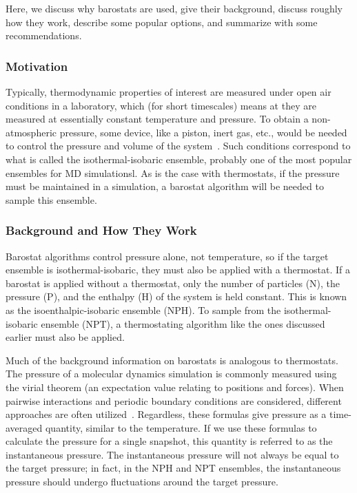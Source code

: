 \documentclass[9pt,bestpractices]{livecoms}
\begin{document}
Here, we discuss why barostats are used, give their background, discuss roughly how they work, describe some popular options, and summarize with some recommendations.

\subsubsection{Motivation}
Typically, thermodynamic properties of interest are measured under open air conditions in a laboratory, which (for short timescales) means at they are measured at essentially constant temperature and pressure.
To obtain a non-atmospheric pressure, some device, like a piston, inert gas, etc\@., would be needed to control the pressure and volume of the system~\cite{tuckermanBook, ShellNotes}.
Such conditions correspond to what is called the isothermal-isobaric ensemble, probably one of the most popular ensembles for MD simulationsl.
As is the case with thermostats, if the pressure must be maintained in a simulation, a barostat algorithm will be needed to sample this ensemble.

\subsubsection{Background and How They Work}

Barostat algorithms control pressure alone, not temperature, so if the target ensemble is isothermal-isobaric, they must also be applied with a thermostat.
If a barostat is applied without a thermostat, only the number of particles (N), the pressure (P), and the enthalpy (H) of the system is held constant.
This is known as the isoenthalpic-isobaric ensemble (NPH).
To sample from the isothermal-isobaric ensemble (NPT), a thermostating algorithm like the ones discussed earlier must also be applied.

Much of the background information on barostats is analogous to thermostats.
The pressure of a molecular dynamics simulation is commonly measured using the virial theorem (an expectation value relating to positions and forces)\cite{ShellNotes, LeachBook}.
When pairwise interactions and periodic boundary conditions are considered, different approaches are often utilized~\cite{allenTildesleyLiquids, tuckermanBook, ShellNotes}.
Regardless, these formulas give pressure as a time-averaged quantity, similar to the temperature.
If we use these formulas to calculate the pressure for a single snapshot, this quantity is referred to as the instantaneous pressure.
The instantaneous pressure will not always be equal to the target pressure; in fact, in the NPH and NPT ensembles, the instantaneous pressure should undergo fluctuations around the target pressure.
\end{document}
